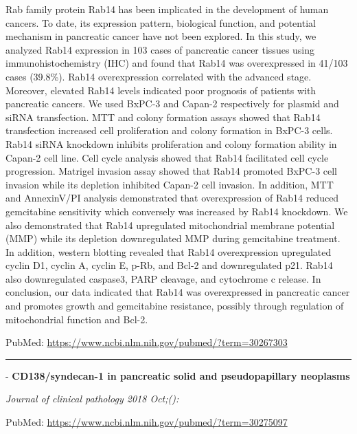 \documentclass[]{article}
\begin{document}
Rab family protein Rab14 has been implicated in the development of human
cancers. To date, its expression pattern, biological function, and
potential mechanism in pancreatic cancer have not been explored. In this
study, we analyzed Rab14 expression in 103 cases of pancreatic cancer
tissues using immunohistochemistry (IHC) and found that Rab14 was
overexpressed in 41/103 cases (39.8\%). Rab14 overexpression correlated
with the advanced stage. Moreover, elevated Rab14 levels indicated poor
prognosis of patients with pancreatic cancers. We used BxPC-3 and
Capan-2 respectively for plasmid and siRNA transfection. MTT and colony
formation assays showed that Rab14 transfection increased cell
proliferation and colony formation in BxPC-3 cells. Rab14 siRNA
knockdown inhibits proliferation and colony formation ability in Capan-2
cell line. Cell cycle analysis showed that Rab14 facilitated cell cycle
progression. Matrigel invasion assay showed that Rab14 promoted BxPC-3
cell invasion while its depletion inhibited Capan-2 cell invasion. In
addition, MTT and AnnexinV/PI analysis demonstrated that overexpression
of Rab14 reduced gemcitabine sensitivity which conversely was increased
by Rab14 knockdown. We also demonstrated that Rab14 upregulated
mitochondrial membrane potential (MMP) while its depletion downregulated
MMP during gemcitabine treatment. In addition, western blotting revealed
that Rab14 overexpression upregulated cyclin D1, cyclin A, cyclin E,
p-Rb, and Bcl-2 and downregulated p21. Rab14 also downregulated
caspase3, PARP cleavage, and cytochrome c release. In conclusion, our
data indicated that Rab14 was overexpressed in pancreatic cancer and
promotes growth and gemcitabine resistance, possibly through regulation
of mitochondrial function and Bcl-2.

PubMed: \url{https://www.ncbi.nlm.nih.gov/pubmed/?term=30267303}

{}

{}

\begin{center}\rule{0.5\linewidth}{\linethickness}\end{center}

 - \textbf{CD138/syndecan-1 in pancreatic solid and pseudopapillary
neoplasms}

\emph{Journal of clinical pathology 2018 Oct;():}

PubMed: \url{https://www.ncbi.nlm.nih.gov/pubmed/?term=30275097}

{}

{}
\end{document}
